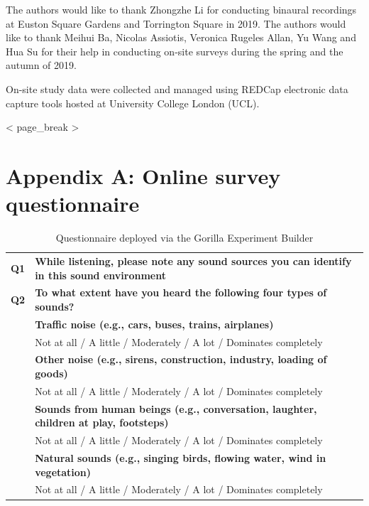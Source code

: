 \documentclass[
  authoryear,
  preprint,
  3p,
  onecolumn]{elsarticle}
\begin{document}
The authors would like to thank Zhongzhe Li for conducting binaural
recordings at Euston Square Gardens and Torrington Square in 2019. The
authors would like to thank Meihui Ba, Nicolas Assiotis, Veronica
Rugeles Allan, Yu Wang and Hua Su for their help in conducting on-site
surveys during the spring and the autumn of 2019.

On-site study data were collected and managed using REDCap electronic
data capture tools hosted at University College London (UCL).

{{< page_break >}}

\section*{Appendix A: Online survey
questionnaire}\label{appendix-a-online-survey-questionnaire}

\begin{longtable}[]{@{}
  >{\centering\arraybackslash}p{}
  >{\raggedright\arraybackslash}p{}@{}}
\caption{Questionnaire deployed via the Gorilla Experiment
Builder}\label{tbl-gorilla}\tabularnewline
\toprule\noalign{}
\endfirsthead
\endhead
\bottomrule\noalign{}
\endlastfoot
\textbf{Q1} & \textbf{While listening, please note any sound sources you
can identify in this sound environment} \\
\textbf{Q2} & \textbf{To what extent have you heard the following four
types of sounds?} \\
& \textbf{Traffic noise (e.g., cars, buses, trains, airplanes)} \\
& Not at all / A little / Moderately / A lot / Dominates completely \\
& \textbf{Other noise (e.g., sirens, construction, industry, loading of
goods)} \\
& Not at all / A little / Moderately / A lot / Dominates completely \\
& \textbf{Sounds from human beings (e.g., conversation, laughter,
children at play, footsteps)} \\
& Not at all / A little / Moderately / A lot / Dominates completely \\
& \textbf{Natural sounds (e.g., singing birds, flowing water, wind in
vegetation)} \\
& Not at all / A little / Moderately / A lot / Dominates completely \\
\end{longtable}
\end{document}
